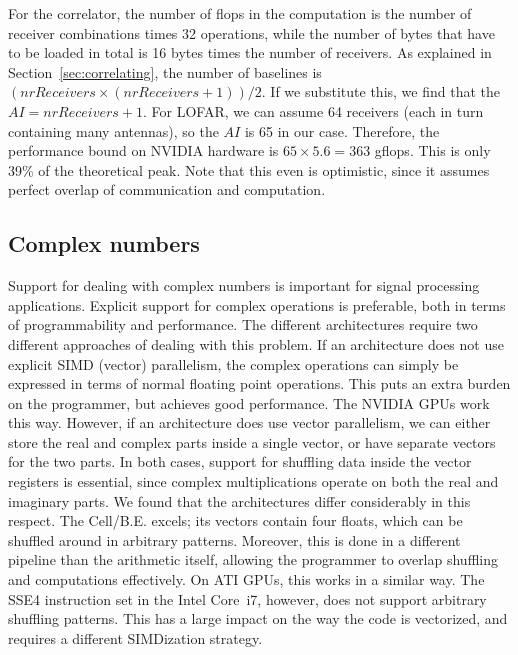 \documentclass{article}
\begin{document}
For the correlator, the number of flops in the computation is the
number of receiver combinations times 32 operations, while the number
of bytes that have to be loaded in total is 16 bytes times the number
of receivers.  As explained in Section~\ref{sec:correlating}, the
number of baselines is $(nrReceivers \times (nrReceivers + 1)) / 2$.
If we substitute this, we find that the $AI = nrReceivers + 1$.  For
LOFAR, we can assume 64 receivers (each in turn containing many
antennas), so the $AI$ is 65 in our case.  Therefore, the performance
bound on NVIDIA hardware is $65 \times 5.6 = 363$ gflops. This is only
39\% of the theoretical peak.  Note that this even is optimistic,
since it assumes perfect overlap of communication and computation.


\subsection{Complex numbers}

Support for dealing with complex numbers is important for signal
processing applications. Explicit support for complex operations is
preferable, both in terms of programmability and performance. 
The different architectures require two different approaches of
dealing with this problem. If an architecture does not use
explicit SIMD (vector) parallelism, the complex operations can simply
be expressed in terms of normal floating point operations. This puts
an extra burden on the programmer, but achieves good performance. The
NVIDIA GPUs work this way.  However, if an architecture does use vector
parallelism, we can either store the real and complex parts inside a
single vector, or have separate vectors for the two parts.  In both
cases, support for shuffling data inside the vector registers is
essential, since complex multiplications operate on both the real and imaginary parts.
We found that the architectures differ considerably in this
respect.  The Cell/B.E. excels; its vectors contain four floats, which
can be shuffled around in arbitrary patterns. Moreover, this is done
in a different pipeline than the arithmetic itself, allowing the
programmer to overlap shuffling and computations effectively.  On ATI
GPUs, this works in a similar way.  The SSE4 instruction set in the
Intel Core~i7, however, does not support arbitrary shuffling patterns.
This has a large impact on the way the code is vectorized, and
requires a different SIMDization strategy. 
\end{document}
